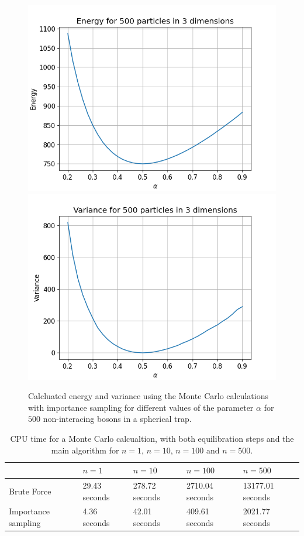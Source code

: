 \documentclass[a4paper, 10pt, english]{revtex4-2} %
\begin{document}
    \begin{figure}[!ht]
        \centering
        \includegraphics[width=\imwidth]{figures/Energy_C_500.png}
        \includegraphics[width=\imwidth]{figures/Varience_C_500.png}
        \caption{Calcluated energy and variance using the Monte Carlo calculations with importance sampling for different values of the parameter $\alpha$ for $500$ non-interacing bosons in a spherical trap.}
        \label{fig: C500}
    \end{figure}\newpage
    
    \begin{table}[!ht]
        \begin{tabular}{|l|l|l|l|l|}
        \hline
                            & $n=1$         & $n=10$         & $n=100$         & $n=500$         \\ \hline
        Brute Force         & 29.43 seconds & 278.72 seconds & 2710.04 seconds & 13177.01 seconds\\ \hline
        Importance sampling & 4.36 seconds  & 42.01 seconds  & 409.61 seconds  & 2021.77 seconds \\ \hline
        \end{tabular}
        \caption{CPU time for a Monte Carlo calcualtion, with both equilibration steps and the main algorithm for $n=1$, $n=10$, $n=100$ and $n = 500$.}
        \label{table: time spent}
    \end{table}
\end{document}
